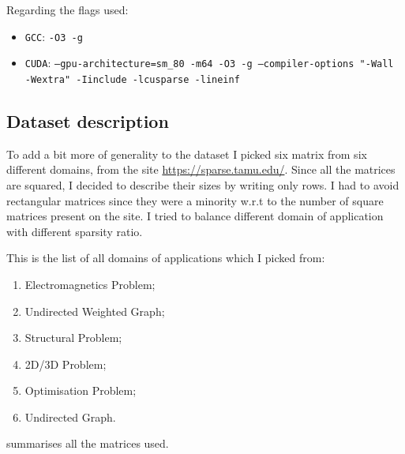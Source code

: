 \documentclass[conference]{IEEEtran}
\begin{document}
Regarding the flags used:

\begin{itemize}
\item\texttt{GCC}: \texttt{-O3 -g}
\item\texttt{CUDA}: \texttt{--gpu-architecture=sm\_80 -m64 -O3 -g --compiler-options "-Wall -Wextra" -Iinclude -lcusparse -lineinf}
\end{itemize}

\subsection{Dataset description}


To add a bit more of generality to the dataset I picked six matrix from six different domains, from the site \url{https://sparse.tamu.edu/}. Since all the matrices are squared, I decided to describe their sizes by writing only rows. I had to avoid rectangular matrices since they were a minority w.r.t to the number of square matrices present on the site. I tried to balance different domain of application with different sparsity ratio.

This is the list of all domains of applications which I picked from:
\begin{enumerate}
\item Electromagnetics Problem; %
\item Undirected Weighted Graph;%
\item Structural Problem; %
\item 2D/3D Problem; %
\item Optimisation Problem;
\item Undirected Graph. %
\end{enumerate}

 summarises all the matrices used.
\end{document}
